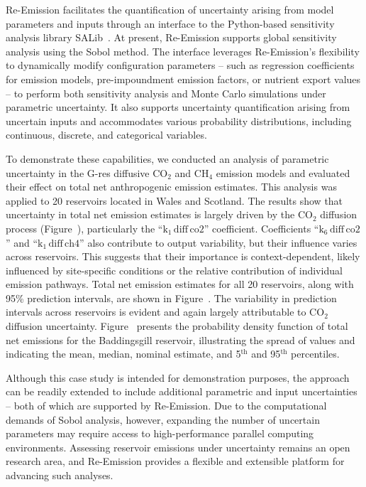 \documentclass[final,1p,times]{elsarticle}
\begin{document}
Re-Emission facilitates the quantification of uncertainty arising from model parameters and inputs through an interface to the Python-based sensitivity analysis library SALib~\cite{Iwanaga_Toward_SALib_2_0_2022}.
At present, Re-Emission supports global sensitivity analysis using the Sobol method.
The interface leverages Re-Emission’s flexibility to dynamically modify configuration parameters -- such as regression coefficients for emission models, pre-impoundment emission factors, or nutrient export values -- to perform both sensitivity analysis and Monte Carlo simulations under parametric uncertainty.
It also supports uncertainty quantification arising from uncertain inputs and accommodates various probability distributions, including continuous, discrete, and categorical variables.

To demonstrate these capabilities, we conducted an analysis of parametric uncertainty in the G-res diffusive CO$_2$ and CH$_4$ emission models and evaluated their effect on total net anthropogenic emission estimates. 
This analysis was applied to 20 reservoirs located in Wales and Scotland. 
The results show that uncertainty in total net emission estimates is largely driven by the CO$_2$ diffusion process (Figure~), particularly the ``$\textrm{k}_1\,\textrm{diff}\,\textrm{co2}$'' coefficient. Coefficients ``$\textrm{k}_6\,\textrm{diff}\,\textrm{co2}$'' and ``$\textrm{k}_1\,\textrm{diff}\,\textrm{ch4}$'' also contribute to output variability, but their influence varies across reservoirs. This suggests that their importance is context-dependent, likely influenced by site-specific conditions or the relative contribution of individual emission pathways. 
Total net emission estimates for all 20 reservoirs, along with 95\% prediction intervals, are shown in Figure~.
The variability in prediction intervals across reservoirs is evident and again largely attributable to CO$_2$ diffusion uncertainty.
Figure~ presents the probability density function of total net emissions for the Baddingsgill reservoir, illustrating the spread of values and indicating the mean, median, nominal estimate, and 5$^\textrm{th}$ and 95$^\textrm{th}$ percentiles.

Although this case study is intended for demonstration purposes, the approach can be readily extended to include additional parametric and input uncertainties -- both of which are supported by Re-Emission.
Due to the computational demands of Sobol analysis, however, expanding the number of uncertain parameters may require access to high-performance parallel computing environments.
Assessing reservoir emissions under uncertainty remains an open research area, and Re-Emission provides a flexible and extensible platform for advancing such analyses.
\end{document}
